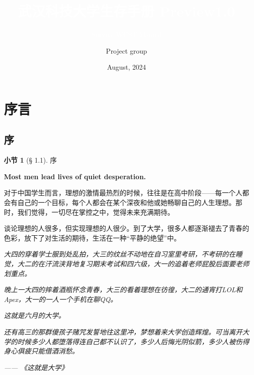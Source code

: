 \documentclass{beamer}	%
\title{\textcolor{white}{武汉科技大学生存手册 Preview1.0}}
\subtitle{\textcolor{white}{Survive WUST Manual}}
\author{Project group}
\date{August, 2024}
\theoremstyle{plain}
\theoremstyle{definition}
\newtheorem{dfn}{小节}[section]
\theoremstyle{remark}
\numberwithin{equation}{section}
\begin{document}
\begin{frame}
\titlepage
\end{frame}



\section{序言}



\subsection{序}
\begin{frame}

	\begin{dfn}[§ 1.1]
		序
	\end{dfn}
	
\end{frame}



\begin{frame}
	\begin{LARGE}
		\textbf{Most men lead lives of quiet desperation. }
	\end{LARGE}
	
	\vspace{1cm}

	对于中国学生而言，理想的激情最热烈的时候，往往是在高中阶段——每一个人都会有自己的一个目标，每个人都会在某个深夜和他或她畅聊自己的人生理想。那时，我们觉得，一切尽在掌控之中，觉得未来充满期待。
	\vspace{0.5cm}

	谈论理想的人很多，但实现理想的人很少。到了大学，很多人都逐渐褪去了青春的色彩，放下了对生活的期待，生活在一种“平静的绝望”中。
	\vspace{0.5cm}
\end{frame}

\begin{frame}
	\textit{大四的穿着学士服到处乱拍，大三的纹丝不动地在自习室里考研，不考研的在睡觉，大二的在汗流浃背地复习期末考试和四六级，大一的追着老师屁股后面要老师划重点。}
	\vspace{0.5cm}
	
	\textit{晚上一大四的摔着酒瓶怀念青春，大三的看着理想在彷徨，大二的通宵打LOL和Apex，大一的一人一个手机在聊QQ。}
	\vspace{0.5cm}
	
	\textit{这就是六月的大学。}
	\vspace{0.5cm}
	
	\textit{还有高三的那群傻孩子赌咒发誓地往这里冲，梦想着来大学创造辉煌。可当离开大学的时候多少人都堕落得连自己都不认识了，多少人后悔光阴似箭，多少人被伤得身心俱疲只能借酒消愁。}
	\vspace{0.5cm}
	
	\textit{—— 《这就是大学》}
\end{frame}
\end{document}

